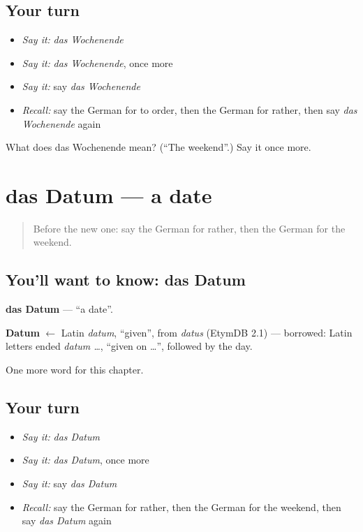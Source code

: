 \subsection*{Your turn}
\begin{itemize}
\raggedright
  \item \emph{Say it:} \emph{das Wochenende}
  \item \emph{Say it:} \emph{das Wochenende}, once more
  \item \emph{Say it:} say \emph{das Wochenende}
  \item \emph{Recall:} say the German for to order, then the German for rather, then say \emph{das Wochenende} again
\end{itemize}

\begin{tcolorbox}[breakable,colback=teal!4,colframe=teal!35!black,title={Before you move on}]
What does das Wochenende mean? (\textquotedblleft{}The weekend\textquotedblright{}.) Say it once more.
\end{tcolorbox}
\section[das Datum]{das Datum — a date}

\label{lesson:GE-C137-datum}



\begin{quote}
Before the new one: say the German for rather, then the German for the weekend.
\end{quote}

\subsection*{You'll want to know: das Datum}
\textbf{das Datum} — \textquotedblleft{}a date\textquotedblright{}.

\begin{cousinweb}
\textbf{Datum} $\leftarrow$ Latin \emph{datum}, \textquotedblleft{}given\textquotedblright{}, from \emph{datus} (EtymDB 2.1) — borrowed: Latin letters ended \emph{datum …}, \textquotedblleft{}given on …\textquotedblright{}, followed by the day.
\end{cousinweb}

\begin{grammarlens}[title={What you've built}]
One more word for this chapter.
\end{grammarlens}

\subsection*{Your turn}
\begin{itemize}
\raggedright
  \item \emph{Say it:} \emph{das Datum}
  \item \emph{Say it:} \emph{das Datum}, once more
  \item \emph{Say it:} say \emph{das Datum}
  \item \emph{Recall:} say the German for rather, then the German for the weekend, then say \emph{das Datum} again
\end{itemize}

